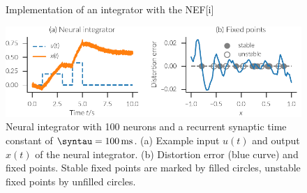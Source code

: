 \begin{figure}
    \begin{captionbeside}{Implementation of an integrator with the NEF\label{fig:integrator-net}}[i]
    \end{captionbeside}
\end{figure}
\begin{figure}
    \centering
    \includegraphics{figures/integrator}
    \caption[Neural integrator]{Neural integrator with \num{100} neurons and a recurrent synaptic time constant of $\syntau = \SI{100}{\milli\second}$. (a) Example input $u(t)$ and output $x(t)$ of the neural integrator. (b) Distortion error (blue curve) and fixed points. Stable fixed points are marked by filled circles, unstable fixed points by unfilled circles.}\label{fig:integrator}
\end{figure}


